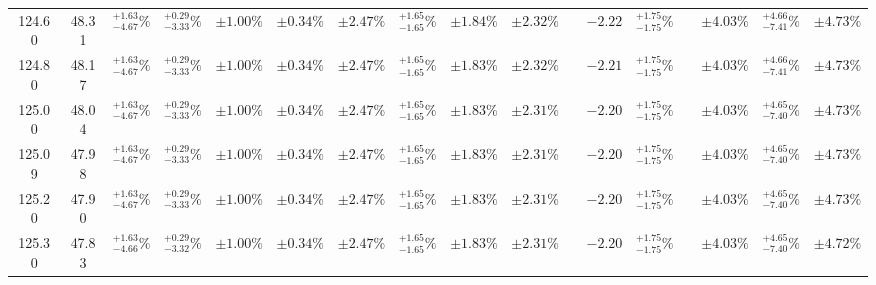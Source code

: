 \begin{landscape}
\begin{table}[ht!]
{\begin{tabular}{| cc | cccc | ccc | c |@{}c@{\;}| cc |@{}c@{\;}| ccc |}
124.60 & 48.31 & \({}^{ +1.63}_{ -4.67}\%\) & {\color{black!55}\({}^{ +0.29}_{ -3.33}\%\)} & {\color{black!55}\(\pm{  1.00}\%\)} & {\color{black!55}\(\pm{  0.34}\%\)} & \(\pm 2.47\%\) & {\color{black!55}\({}^{ +1.65}_{ -1.65}\%\)} & {\color{black!55}\(\pm 1.84\%\)} & \(\pm{  2.32}\%\) &  & \(-2.22\) & \({}^{ +1.75}_{ -1.75}\%\) &  & \(\pm 4.03\%\) & \({}^{ +4.66}_{ -7.41}\%\) & \(\pm 4.73\%\)\\
124.80 & 48.17 & \({}^{ +1.63}_{ -4.67}\%\) & {\color{black!55}\({}^{ +0.29}_{ -3.33}\%\)} & {\color{black!55}\(\pm{  1.00}\%\)} & {\color{black!55}\(\pm{  0.34}\%\)} & \(\pm 2.47\%\) & {\color{black!55}\({}^{ +1.65}_{ -1.65}\%\)} & {\color{black!55}\(\pm 1.83\%\)} & \(\pm{  2.32}\%\) &  & \(-2.21\) & \({}^{ +1.75}_{ -1.75}\%\) &  & \(\pm 4.03\%\) & \({}^{ +4.66}_{ -7.41}\%\) & \(\pm 4.73\%\)\\
125.00 & 48.04 & \({}^{ +1.63}_{ -4.67}\%\) & {\color{black!55}\({}^{ +0.29}_{ -3.33}\%\)} & {\color{black!55}\(\pm{  1.00}\%\)} & {\color{black!55}\(\pm{  0.34}\%\)} & \(\pm 2.47\%\) & {\color{black!55}\({}^{ +1.65}_{ -1.65}\%\)} & {\color{black!55}\(\pm 1.83\%\)} & \(\pm{  2.31}\%\) &  & \(-2.20\) & \({}^{ +1.75}_{ -1.75}\%\) &  & \(\pm 4.03\%\) & \({}^{ +4.65}_{ -7.40}\%\) & \(\pm 4.73\%\)\\
125.09 & 47.98 & \({}^{ +1.63}_{ -4.67}\%\) & {\color{black!55}\({}^{ +0.29}_{ -3.33}\%\)} & {\color{black!55}\(\pm{  1.00}\%\)} & {\color{black!55}\(\pm{  0.34}\%\)} & \(\pm 2.47\%\) & {\color{black!55}\({}^{ +1.65}_{ -1.65}\%\)} & {\color{black!55}\(\pm 1.83\%\)} & \(\pm{  2.31}\%\) &  & \(-2.20\) & \({}^{ +1.75}_{ -1.75}\%\) &  & \(\pm 4.03\%\) & \({}^{ +4.65}_{ -7.40}\%\) & \(\pm 4.73\%\)\\
125.20 & 47.90 & \({}^{ +1.63}_{ -4.67}\%\) & {\color{black!55}\({}^{ +0.29}_{ -3.33}\%\)} & {\color{black!55}\(\pm{  1.00}\%\)} & {\color{black!55}\(\pm{  0.34}\%\)} & \(\pm 2.47\%\) & {\color{black!55}\({}^{ +1.65}_{ -1.65}\%\)} & {\color{black!55}\(\pm 1.83\%\)} & \(\pm{  2.31}\%\) &  & \(-2.20\) & \({}^{ +1.75}_{ -1.75}\%\) &  & \(\pm 4.03\%\) & \({}^{ +4.65}_{ -7.40}\%\) & \(\pm 4.73\%\)\\
125.30 & 47.83 & \({}^{ +1.63}_{ -4.66}\%\) & {\color{black!55}\({}^{ +0.29}_{ -3.32}\%\)} & {\color{black!55}\(\pm{  1.00}\%\)} & {\color{black!55}\(\pm{  0.34}\%\)} & \(\pm 2.47\%\) & {\color{black!55}\({}^{ +1.65}_{ -1.65}\%\)} & {\color{black!55}\(\pm 1.83\%\)} & \(\pm{  2.31}\%\) &  & \(-2.20\) & \({}^{ +1.75}_{ -1.75}\%\) &  & \(\pm 4.03\%\) & \({}^{ +4.65}_{ -7.40}\%\) & \(\pm 4.72\%\)\\

\end{tabular}}
\end{table}
\end{landscape}
